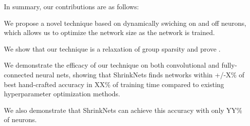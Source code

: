 In summary, our contributions are as follows: 
\begin{compactenum}
\item We propose a novel technique based on dynamically swiching on and off neurons, 
which allows us to optimize the network size as the network is trained. 
\item We show that our technique is a relaxation of group sparsity and 
prove . 
\item {}
\item We demonstrate the efficacy of our technique on both convolutional and fully-connected neural nets,
showing that 
ShrinkNets finds networks within +/-X\% of best hand-crafted accuracy in XX\% of
training time compared to existing hyperparameter optimization methods.
\item We also demonstrate that ShrinkNets can achieve this accuracy with only YY\% 
of neurons.
\item {}
\item {}
\end{compactenum}